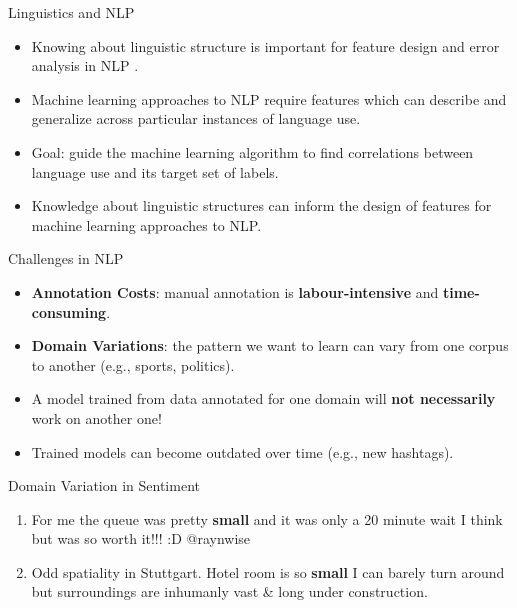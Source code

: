 \documentclass[handout]{beamer}
\begin{document}
\begin{frame}{Linguistics and NLP}
\begin{scriptsize}
  \begin{itemize}
   \item Knowing about linguistic structure is important for feature design
and error analysis in NLP \cite{bender2013linguistic}.

\item Machine learning approaches to NLP require features which can describe and generalize across particular instances of language use.
\item Goal: guide the machine learning algorithm to find correlations between language use and its target set of labels.
\item Knowledge about linguistic structures can inform the design of
features for machine learning approaches to NLP.
  \end{itemize}
\end{scriptsize}

 
\end{frame}




\begin{frame}{Challenges in NLP}
\begin{scriptsize}
  \begin{itemize}
   \item \textbf{Annotation Costs}: manual annotation is \textbf{labour-intensive} and \textbf{time-consuming}. 
   \item \textbf{Domain Variations}: the pattern we want to learn can vary from one corpus to another (e.g., sports, politics).
 
 \item A model trained from data annotated for one domain will \textbf{not necessarily} work on another one! 
\item Trained models can become outdated over time (e.g., new hashtags).
  \end{itemize} 



\begin{block}{Domain Variation in Sentiment}
\begin{enumerate}
\item  For me the queue was pretty \textcolor[rgb]{0.00,0.00,1.00}{\textbf{small}} and it was only a 20 minute wait I think but was so worth it!!! :D @raynwise
\item Odd spatiality in Stuttgart. Hotel room is so  \textcolor[rgb]{1.00,0.00,0.00}{\textbf{small}} I can barely turn around but surroundings are inhumanly vast \& long under construction.
\end{enumerate}
\end{block}


\end{scriptsize}

\end{frame}
\end{document}
